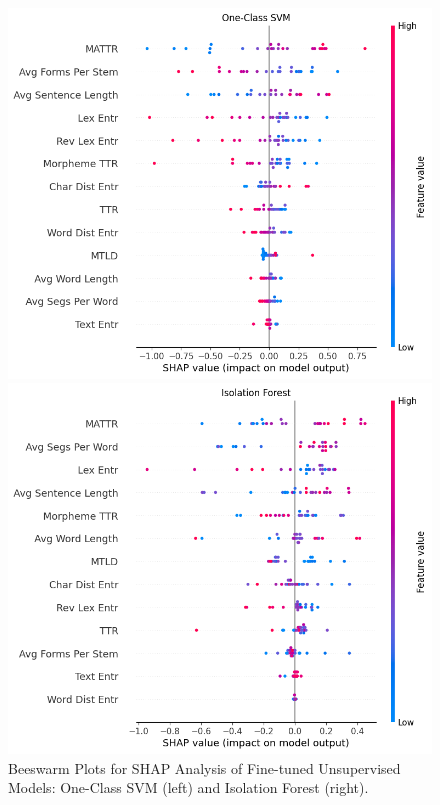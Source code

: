 \documentclass[12pt,a4paper]{article}
\numberwithin{figure}{section}
\numberwithin{table}{section}
\numberwithin{definition}{section}
\begin{document}
\begin{figure}[!h]
  \centering
  \begin{minipage}{0.5\textwidth}
    \includegraphics[width=\textwidth]{OCSVM_SHAP_values.png}
  \end{minipage}\hfill
  \begin{minipage}{0.5\textwidth}
    \includegraphics[width=\textwidth]{IF_SHAP_values.png}
  \end{minipage}
    \caption{Beeswarm Plots for SHAP Analysis of Fine-tuned Unsupervised Models: One-Class SVM (left) and Isolation Forest (right).}
    \label{fig:unsupervisedshap}
\end{figure}
\end{document}
